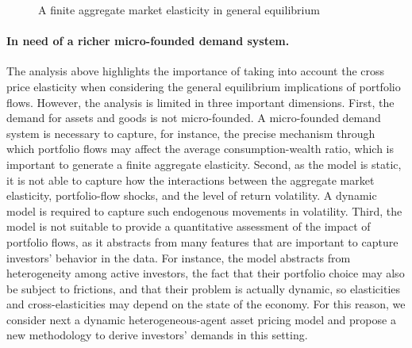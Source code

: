 \begin{figure}
    \caption{A finite aggregate market elasticity in general equilibrium}
    \label{fig:mkt_equilibrium_positive_elasticity}
\end{figure}



\paragraph{In need of a richer micro-founded demand system.} The analysis above highlights the importance of taking into account the cross price elasticity when considering the general equilibrium implications of portfolio flows. 
However, the analysis is limited in three important dimensions. 
First, the demand for assets and goods is not micro-founded. 
A micro-founded demand system is necessary to capture, for instance, the precise mechanism through which portfolio flows may affect the average consumption-wealth ratio, which is important to generate a finite aggregate elasticity. 
Second, as the model is static, it is not able to capture how the interactions between the aggregate market elasticity, portfolio-flow shocks, and the level of return volatility. 
A dynamic model is required to capture such endogenous movements in volatility.
Third, the model is not suitable to provide a quantitative assessment of the impact of portfolio flows, as it abstracts from many features that are important to capture investors' behavior in the data. 
For instance, the model abstracts from heterogeneity among active investors, the fact that their portfolio choice may also be subject to frictions, and that their problem is actually dynamic, so elasticities and cross-elasticities may depend on the state of the economy. 
For this reason, we consider next a dynamic heterogeneous-agent asset pricing model and propose a new methodology to derive investors' demands in this setting.

